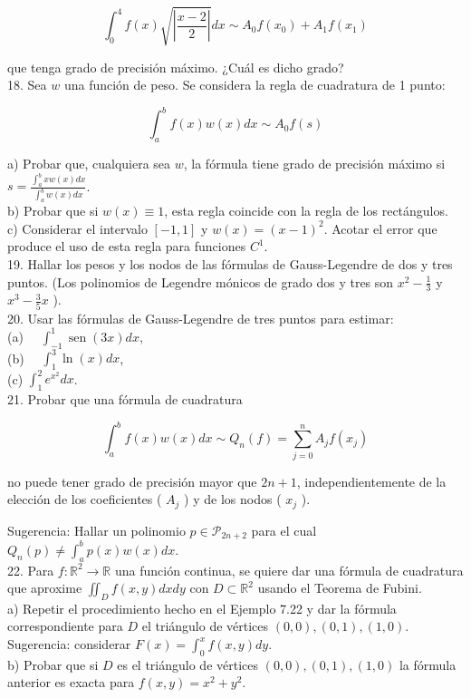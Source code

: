 \documentclass[10pt]{article}
\begin{document}
$$
\int_{0}^{4} f(x) \sqrt{\left|\frac{x-2}{2}\right|} d x \sim A_{0} f\left(x_{0}\right)+A_{1} f\left(x_{1}\right)
$$

que tenga grado de precisión máximo. ¿Cuál es dicho grado?\\
18. Sea $w$ una función de peso. Se considera la regla de cuadratura de 1 punto:

$$
\int_{a}^{b} f(x) w(x) d x \sim A_{0} f(s)
$$

a) Probar que, cualquiera sea $w$, la fórmula tiene grado de precisión máximo si $s= \frac{\int_{a}^{b} x w(x) d x}{\int_{a}^{b} w(x) d x}$.\\
b) Probar que si $w(x) \equiv 1$, esta regla coincide con la regla de los rectángulos.\\
c) Considerar el intervalo $[-1,1]$ y $w(x)=(x-1)^{2}$. Acotar el error que produce el uso de esta regla para funciones $C^{1}$.\\
19. Hallar los pesos y los nodos de las fórmulas de Gauss-Legendre de dos y tres puntos. (Los polinomios de Legendre mónicos de grado dos y tres son $x^{2}-\frac{1}{3}$ y $x^{3}-\frac{3}{5} x$ ).\\
20. Usar las fórmulas de Gauss-Legendre de tres puntos para estimar:\\
(a) $\quad \int_{-1}^{1} \operatorname{sen}(3 x) d x$,\\
(b) $\quad \int_{1}^{3} \ln (x) d x$,\\
(c) $\int_{1}^{2} e^{x^{2}} d x$.\\
21. Probar que una fórmula de cuadratura

$$
\int_{a}^{b} f(x) w(x) d x \sim Q_{n}(f)=\sum_{j=0}^{n} A_{j} f\left(x_{j}\right)
$$

no puede tener grado de precisión mayor que $2 n+1$, independientemente de la elección de los coeficientes ( $A_{j}$ ) y de los nodos ( $x_{j}$ ).

Sugerencia: Hallar un polinomio $p \in \mathcal{P}_{2 n+2}$ para el cual $Q_{n}(p) \neq \int_{a}^{b} p(x) w(x) d x$.\\
22. Para $f: \mathbb{R}^{2} \rightarrow \mathbb{R}$ una función continua, se quiere dar una fórmula de cuadratura que aproxime $\iint_{D} f(x, y) d x d y$ con $D \subset \mathbb{R}^{2}$ usando el Teorema de Fubini.\\
a) Repetir el procedimiento hecho en el Ejemplo 7.22 y dar la fórmula correspondiente para $D$ el triángulo de vértices $(0,0),(0,1),(1,0)$.\\
Sugerencia: considerar $F(x)=\int_{0}^{x} f(x, y) d y$.\\
b) Probar que si $D$ es el triángulo de vértices $(0,0),(0,1),(1,0)$ la fórmula anterior es exacta para $f(x, y)=x^{2}+y^{2}$.
\end{document}
